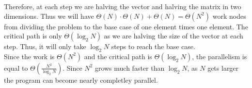 \documentclass{article}%
\begin{document}
        Therefore, at each step we are halving the vector and halving the matrix in two dimensions. Thus we will have $\Theta(N) \cdot \Theta(N) +  \Theta(N) = \Theta(N^2)$ work nodes from dividing the problem to the base case of one element times one element. The critical path is only $\Theta(\log_2{N})$ as we are halving the size of the vector at each step. Thus, it will only take $\log_2{N}$ steps to reach the base case.\\
        
        Since the work is $\Theta(N^2)$ and the critical path is $\Theta(\log_2{N})$, the parallelism is equal to $\Theta(\frac{N^2}{\log_2{N}})$. Since $N^2$ grows much faster than $\log_2{N}$, as $N$ gets larger the program can become nearly completley parallel. 
        
    
    
\end{document}
